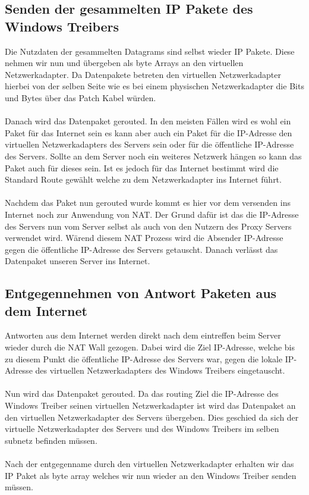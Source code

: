 \subsection{Senden der gesammelten IP Pakete des Windows Treibers}
Die Nutzdaten der gesammelten Datagrams sind selbst wieder IP Pakete. Diese nehmen wir nun und übergeben als byte Arrays an den virtuellen Netzwerkadapter. Da Datenpakete betreten den virtuellen Netzwerkadapter hierbei von der selben Seite wie es bei einem physischen Netzwerkadapter die Bits und Bytes über das Patch Kabel würden.
\\\\  
Danach wird das Datenpaket gerouted. In den meisten Fällen wird es wohl ein Paket für das Internet sein es kann aber auch ein Paket für die IP-Adresse den virtuellen Netzwerkadapters des Servers sein oder für die öffentliche IP-Adresse des Servers. Sollte an dem Server noch ein weiteres Netzwerk hängen so kann das Paket auch für dieses sein. Ist es jedoch für das Internet bestimmt wird die Standard Route gewählt welche zu dem Netzwerkadapter ins Internet führt. 
\\\\
Nachdem das Paket nun gerouted wurde kommt es hier vor dem versenden ins Internet noch zur Anwendung von NAT. Der Grund dafür ist das die IP-Adresse des Servers nun vom Server selbst als auch von den Nutzern des Proxy Servers verwendet wird. Wärend diesem NAT Prozess wird die Absender IP-Adresse gegen die öffentliche IP-Adresse des Servers getauscht. Danach verlässt das Datenpaket unseren Server ins Internet.

\subsection{Entgegennehmen von Antwort Paketen aus dem Internet}
Antworten aus dem Internet werden direkt nach dem eintreffen beim Server wieder durch die NAT Wall gezogen. Dabei wird die Ziel IP-Adresse, welche bis zu diesem Punkt die öffentliche IP-Adresse des Servers war, gegen die lokale IP-Adresse des virtuellen Netzwerkadapters des Windows Treibers eingetauscht.
\\\\ 
Nun wird das Datenpaket gerouted. Da das routing Ziel die IP-Adresse des Windows Treiber seinen virtuellen Netzwerkadapter ist wird das Datenpaket an den virtuellen Netzwerkadapter des Servers übergeben. Dies geschied da sich der virtuelle Netzwerkadapter des Servers und des Windows Treibers im selben subnetz befinden müssen.  
\\\\
Nach der entgegenname durch den virtuellen Netzwerkadapter erhalten wir das IP Paket als byte array welches wir nun wieder an den Windows Treiber senden müssen.

